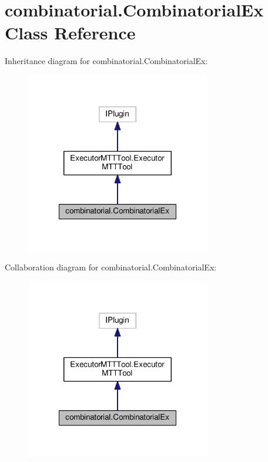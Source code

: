 \hypertarget{classcombinatorial_1_1_combinatorial_ex}{\section{combinatorial.\-Combinatorial\-Ex Class Reference}
\label{classcombinatorial_1_1_combinatorial_ex}
}


Inheritance diagram for combinatorial.\-Combinatorial\-Ex\-:
\nopagebreak
\begin{figure}[H]
\begin{center}
\leavevmode
\includegraphics[width=228pt]{classcombinatorial_1_1_combinatorial_ex__inherit__graph}
\end{center}
\end{figure}


Collaboration diagram for combinatorial.\-Combinatorial\-Ex\-:
\nopagebreak
\begin{figure}[H]
\begin{center}
\leavevmode
\includegraphics[width=228pt]{classcombinatorial_1_1_combinatorial_ex__coll__graph}
\end{center}
\end{figure}
